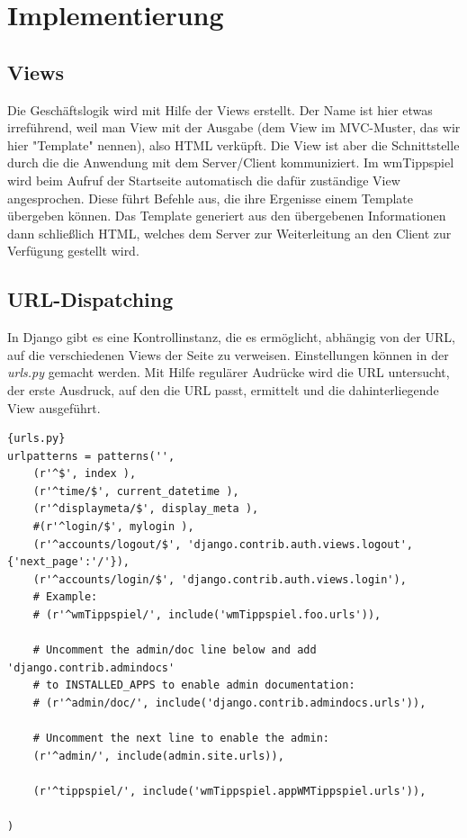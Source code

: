 \chapter{Implementierung}
\section{Views}
Die Geschäftslogik wird mit Hilfe der Views erstellt. Der Name ist hier etwas
irreführend, weil man View mit der Ausgabe (dem View im MVC-Muster, das wir
hier "Template" nennen), also HTML verküpft. Die View ist aber die
Schnittstelle durch die die Anwendung mit dem Server/Client kommuniziert. Im 
wmTippspiel wird beim Aufruf der Startseite automatisch die dafür zuständige 
View angesprochen. Diese führt Befehle aus, die ihre Ergenisse einem Template 
übergeben können. Das Template generiert aus den übergebenen Informationen dann
schließlich HTML, welches dem Server zur Weiterleitung an den Client zur 
Verfügung gestellt wird.

\section{URL-Dispatching}
In Django gibt es eine Kontrollinstanz, die es ermöglicht, abhängig von der URL,
auf die verschiedenen Views der Seite zu verweisen. Einstellungen können in der
\emph{urls.py} gemacht werden. Mit Hilfe regulärer Audrücke wird die URL
untersucht, der erste Ausdruck, auf den die URL passt, ermittelt und
die dahinterliegende View ausgeführt.

\begin{lstlisting}[caption=Auszug ursl.py]{urls.py}
urlpatterns = patterns('',
    (r'^$', index ),
    (r'^time/$', current_datetime ),
    (r'^displaymeta/$', display_meta ),
    #(r'^login/$', mylogin ),
    (r'^accounts/logout/$', 'django.contrib.auth.views.logout', {'next_page':'/'}),
    (r'^accounts/login/$', 'django.contrib.auth.views.login'),
    # Example:
    # (r'^wmTippspiel/', include('wmTippspiel.foo.urls')),

    # Uncomment the admin/doc line below and add 'django.contrib.admindocs'
    # to INSTALLED_APPS to enable admin documentation:
    # (r'^admin/doc/', include('django.contrib.admindocs.urls')),

    # Uncomment the next line to enable the admin:
    (r'^admin/', include(admin.site.urls)),
    
    (r'^tippspiel/', include('wmTippspiel.appWMTippspiel.urls')),
    
)
\end{lstlisting}

